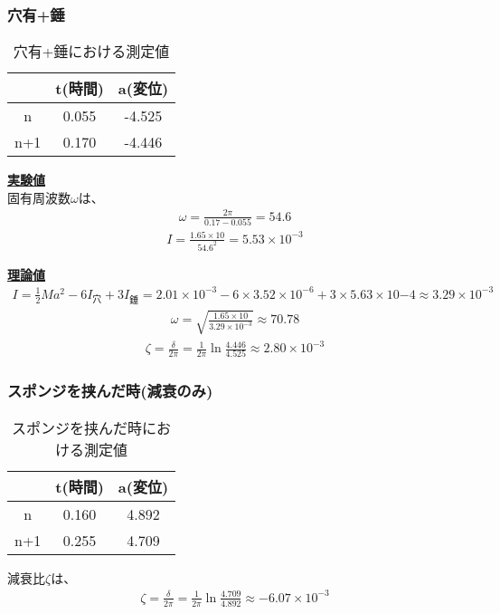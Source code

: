 \documentclass{jsarticle}
\begin{document}
  \subsubsection{穴有+錘}
  \begin{table}[H]
   \begin{center}
    \begin{tabular}{|c||c|c|} \hline
        &t(時間) &a(変位) \\ \hline \hline
     n  &0.055   &-4.525   \\ \hline
     n+1&0.170   &-4.446   \\ \hline
    \end{tabular}
   \end{center}
   \caption{穴有+錘における測定値}
   \label{tbl:ltx-tbl2}
  \end{table}
  \underline{\textbf{実験値}}\\  
  固有周波数$\omega$は、
  \begin{eqnarray}
   \omega=\frac{2\pi}{0.17-0.055}=54.6
  \end{eqnarray}
  \begin{eqnarray}
   I=\frac{1.65\times10}{54.6^2}=5.53\times10^{-3}
  \end{eqnarray}
  
  \underline{\textbf{理論値}}\\  
  \begin{eqnarray}
   I=\frac{1}{2}Ma^2-6I_{穴}+3I_{錘}=2.01\times10^{-3}-6\times3.52\times10^{-6}+3\times5.63\times10{-4}\approx3.29\times10^{-3}
  \end{eqnarray}
  \begin{eqnarray}
   \omega=\sqrt{\frac{1.65\times10}{3.29\times10^{-3}}}\approx70.78
  \end{eqnarray}
  \begin{eqnarray}
   \zeta=\frac{\delta}{2\pi}=\frac{1}{2\pi}\ln{\frac{4.446}{4.525}}\approx2.80\times10^{-3}
  \end{eqnarray}

  \subsubsection{スポンジを挟んだ時(減衰のみ)}
  \begin{table}[H]
   \begin{center}
    \begin{tabular}{|c||c|c|} \hline
        &t(時間) &a(変位) \\ \hline \hline
     n  &0.160   &4.892   \\ \hline
     n+1&0.255   &4.709   \\ \hline
    \end{tabular}
   \end{center}
   \caption{スポンジを挟んだ時における測定値}
   \label{tbl:ltx-tbl2}
  \end{table}
  減衰比$\zeta$は、
  \begin{eqnarray}
   \zeta=\frac{\delta}{2\pi}=\frac{1}{2\pi}\ln{\frac{4.709}{4.892}}\approx-6.07\times10^{-3}
  \end{eqnarray}
\end{document}
